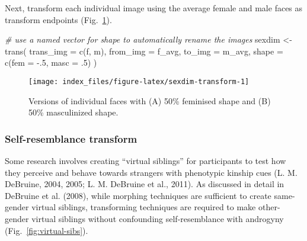 \documentclass[
  doc,floatsintext]{apa6}
\newenvironment{Shaded}{\begin{snugshade}}{\end{snugshade}}
\newcommand{\AttributeTok}[1]{\textcolor[rgb]{0.77,0.63,0.00}{#1}}
\newcommand{\CommentTok}[1]{\textcolor[rgb]{0.56,0.35,0.01}{\textit{#1}}}
\newcommand{\DecValTok}[1]{\textcolor[rgb]{0.00,0.00,0.81}{#1}}
\newcommand{\FunctionTok}[1]{\textcolor[rgb]{0.00,0.00,0.00}{#1}}
\newcommand{\NormalTok}[1]{#1}
\newcommand{\OtherTok}[1]{\textcolor[rgb]{0.56,0.35,0.01}{#1}}
\newcommand{\SpecialCharTok}[1]{\textcolor[rgb]{0.00,0.00,0.00}{#1}}
\begin{document}
Next, transform each individual image using the average female and male faces as transform endpoints (Fig.~\ref{fig:sexdim-transform}).

\begin{Shaded}
\begin{Highlighting}[]
\CommentTok{\# use a named vector for shape to automatically rename the images}
\NormalTok{sexdim }\OtherTok{\textless{}{-}} \FunctionTok{trans}\NormalTok{(}
  \AttributeTok{trans\_img =} \FunctionTok{c}\NormalTok{(f, m),}
  \AttributeTok{from\_img =}\NormalTok{ f\_avg,}
  \AttributeTok{to\_img =}\NormalTok{ m\_avg,}
  \AttributeTok{shape =} \FunctionTok{c}\NormalTok{(}\AttributeTok{fem =} \SpecialCharTok{{-}}\NormalTok{.}\DecValTok{5}\NormalTok{, }\AttributeTok{masc =}\NormalTok{ .}\DecValTok{5}\NormalTok{)}
\NormalTok{)}
\end{Highlighting}
\end{Shaded}



\begin{figure}
\texttt{[image: index\_files/figure-latex/sexdim-transform-1]} \caption{Versions of individual faces with (A) 50\% feminised shape and (B) 50\% masculinized shape.}\label{fig:sexdim-transform}
\end{figure}

\hypertarget{self-resemblance-transform}{%
\subsubsection{Self-resemblance transform}\label{self-resemblance-transform}}

Some research involves creating ``virtual siblings'' for participants to test how they perceive and behave towards strangers with phenotypic kinship cues (L. M. DeBruine, 2004, 2005; L. M. DeBruine et al., 2011). As discussed in detail in DeBruine et al. (2008), while morphing techniques are sufficient to create same-gender virtual siblings, transforming techniques are required to make other-gender virtual siblings without confounding self-resemblance with androgyny (Fig.~\ref{fig:virtual-sibs}).
\end{document}

